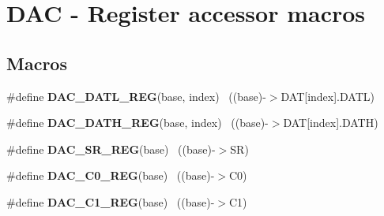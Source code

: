 \hypertarget{group___d_a_c___register___accessor___macros}{}\section{D\+A\+C -\/ Register accessor macros}
\label{group___d_a_c___register___accessor___macros}
\subsection*{Macros}
\begin{DoxyCompactItemize}
\item 
\hypertarget{group___d_a_c___register___accessor___macros_gabf321758d2caebaf297aed5907b1bb5d}{}\#define {\bfseries D\+A\+C\+\_\+\+D\+A\+T\+L\+\_\+\+R\+E\+G}(base,  index)                              ~((base)-\/$>$D\+A\+T\mbox{[}index\mbox{]}.D\+A\+T\+L)\label{group___d_a_c___register___accessor___macros_gabf321758d2caebaf297aed5907b1bb5d}

\item 
\hypertarget{group___d_a_c___register___accessor___macros_ga2993d3474a391b72469826f58317edc9}{}\#define {\bfseries D\+A\+C\+\_\+\+D\+A\+T\+H\+\_\+\+R\+E\+G}(base,  index)                              ~((base)-\/$>$D\+A\+T\mbox{[}index\mbox{]}.D\+A\+T\+H)\label{group___d_a_c___register___accessor___macros_ga2993d3474a391b72469826f58317edc9}

\item 
\hypertarget{group___d_a_c___register___accessor___macros_ga6f61e2c24c3ca2e6207c3a46a95da33a}{}\#define {\bfseries D\+A\+C\+\_\+\+S\+R\+\_\+\+R\+E\+G}(base)                                              ~((base)-\/$>$S\+R)\label{group___d_a_c___register___accessor___macros_ga6f61e2c24c3ca2e6207c3a46a95da33a}

\item 
\hypertarget{group___d_a_c___register___accessor___macros_ga2ad6906035a9d1a45b0493f8010b630b}{}\#define {\bfseries D\+A\+C\+\_\+\+C0\+\_\+\+R\+E\+G}(base)                                              ~((base)-\/$>$C0)\label{group___d_a_c___register___accessor___macros_ga2ad6906035a9d1a45b0493f8010b630b}

\item 
\hypertarget{group___d_a_c___register___accessor___macros_ga4f28424aead9b953486830b6f3c4b3e6}{}\#define {\bfseries D\+A\+C\+\_\+\+C1\+\_\+\+R\+E\+G}(base)                                              ~((base)-\/$>$C1)\label{group___d_a_c___register___accessor___macros_ga4f28424aead9b953486830b6f3c4b3e6}


\end{DoxyCompactItemize}
